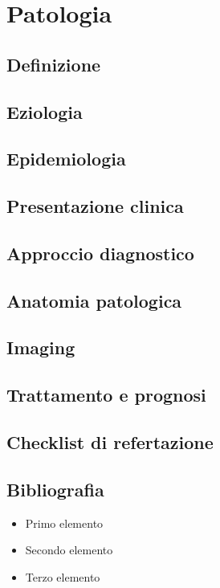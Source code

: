 \section{Patologia}

\subsection{Definizione}

\subsection{Eziologia}

\subsection{Epidemiologia}

\subsection{Presentazione  clinica}

\subsection{Approccio diagnostico}

\subsection{Anatomia patologica}

\subsection{Imaging}

\subsection{Trattamento e prognosi}

\subsection{Checklist di refertazione}

\subsection{Bibliografia}
\small{


}


\begin{itemize}[label=$\square$] %
	\item Primo elemento
	\item Secondo elemento
	\item Terzo elemento
\end{itemize}